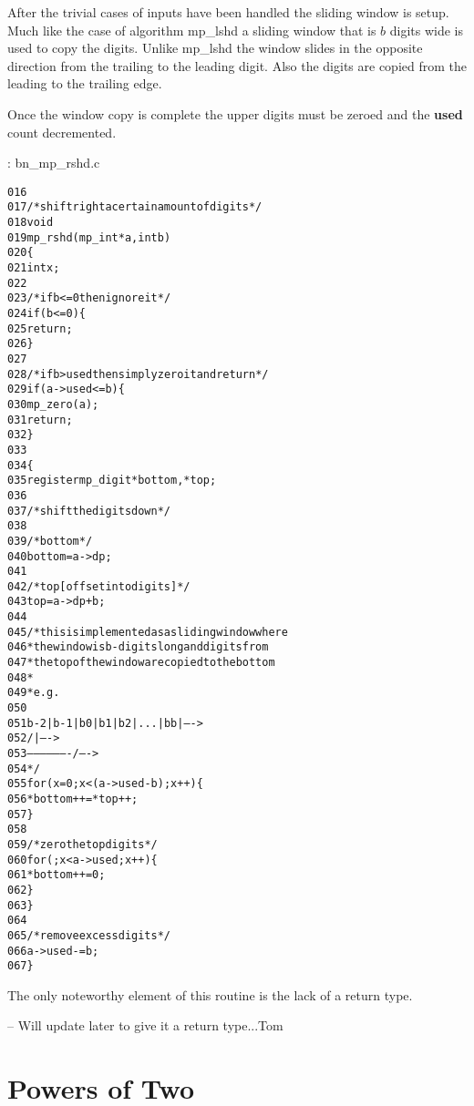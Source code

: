 \documentclass[b5paper]{book}
\begin{document}
After the trivial cases of inputs have been handled the sliding window is setup.  Much like the case of algorithm mp\_lshd a sliding window that
is $b$ digits wide is used to copy the digits.  Unlike mp\_lshd the window slides in the opposite direction from the trailing to the leading digit.  
Also the digits are copied from the leading to the trailing edge.

Once the window copy is complete the upper digits must be zeroed and the \textbf{used} count decremented.

\vspace{+3mm}\begin{small}
\hspace{-5.1mm}{\bf File}: bn\_mp\_rshd.c
\vspace{-3mm}
\begin{alltt}
016   
017   /* shift right a certain amount of digits */
018   void
019   mp_rshd (mp_int * a, int b)
020   \{
021     int     x;
022   
023     /* if b <= 0 then ignore it */
024     if (b <= 0) \{
025       return;
026     \}
027   
028     /* if b > used then simply zero it and return */
029     if (a->used <= b) \{
030       mp_zero (a);
031       return;
032     \}
033   
034     \{
035       register mp_digit *bottom, *top;
036   
037       /* shift the digits down */
038   
039       /* bottom */
040       bottom = a->dp;
041   
042       /* top [offset into digits] */
043       top = a->dp + b;
044   
045       /* this is implemented as a sliding window where 
046        * the window is b-digits long and digits from 
047        * the top of the window are copied to the bottom
048        *
049        * e.g.
050   
051        b-2 | b-1 | b0 | b1 | b2 | ... | bb |   ---->
052                    /                   |      ---->
053                     -------------------/      ---->
054        */
055       for (x = 0; x < (a->used - b); x++) \{
056         *bottom++ = *top++;
057       \}
058   
059       /* zero the top digits */
060       for (; x < a->used; x++) \{
061         *bottom++ = 0;
062       \}
063     \}
064     
065     /* remove excess digits */
066     a->used -= b;
067   \}
\end{alltt}
\end{small}

The only noteworthy element of this routine is the lack of a return type.  

-- Will update later to give it a return type...Tom

\section{Powers of Two}
\end{document}
